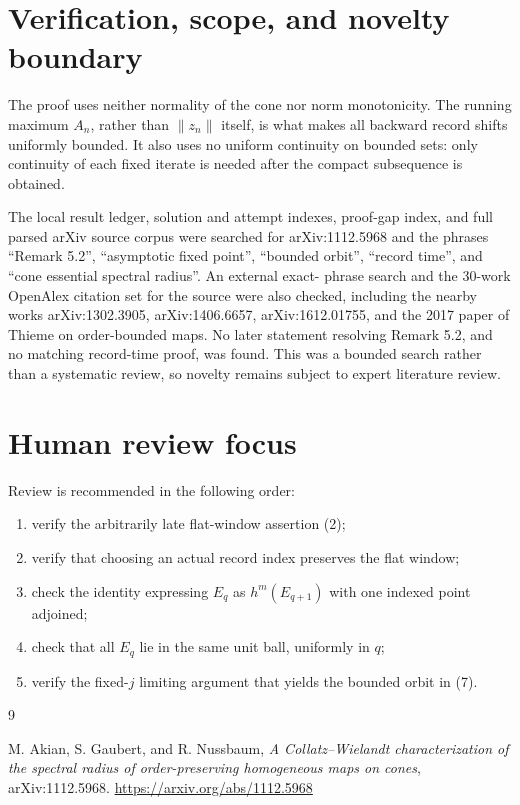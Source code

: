\documentclass[11pt]{article}
\begin{document}
\section{Verification, scope, and novelty boundary}

The proof uses neither normality of the cone nor norm monotonicity. The
running maximum \(A_n\), rather than \(\|z_n\|\) itself, is what makes all
backward record shifts uniformly bounded. It also uses no uniform continuity
on bounded sets: only continuity of each fixed iterate is needed after the
compact subsequence is obtained.

The local result ledger, solution and attempt indexes, proof-gap index, and
full parsed arXiv source corpus were searched for arXiv:1112.5968 and the
phrases ``Remark 5.2'', ``asymptotic fixed point'', ``bounded orbit'',
``record time'', and ``cone essential spectral radius''. An external exact-
phrase search and the 30-work OpenAlex citation set for the source were also
checked, including the nearby works arXiv:1302.3905, arXiv:1406.6657,
arXiv:1612.01755, and the 2017 paper of Thieme on order-bounded maps. No later
statement resolving Remark 5.2, and no matching record-time proof, was found.
This was a bounded search rather than a systematic review, so novelty remains
subject to expert literature review.

\section{Human review focus}

Review is recommended in the following order:

\begin{enumerate}
\item verify the arbitrarily late flat-window assertion (2);
\item verify that choosing an actual record index preserves the flat window;
\item check the identity expressing \(E_q\) as \(h^m(E_{q+1})\) with one
indexed point adjoined;
\item check that all \(E_q\) lie in the same unit ball, uniformly in \(q\);
\item verify the fixed-\(j\) limiting argument that yields the bounded orbit
in (7).
\end{enumerate}

\begin{thebibliography}{9}

M. Akian, S. Gaubert, and R. Nussbaum,
\emph{A Collatz--Wielandt characterization of the spectral radius of
order-preserving homogeneous maps on cones},
arXiv:1112.5968.
\url{https://arxiv.org/abs/1112.5968}

\end{thebibliography}
\end{document}
